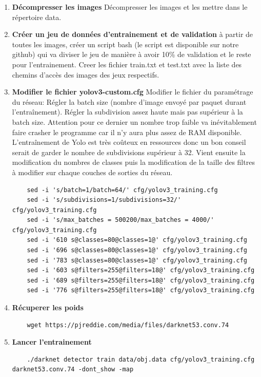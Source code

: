 \documentclass[12pt,a4paper]{report}
\begin{document}
\begin{spacing}{1.5}
\begin{enumerate}
    \item \textbf{Décompresser les images}
    Décompresser les images et les mettre dans le répertoire data.
    
    \item \textbf{Créer un jeu de données d'entrainement et de validation}
    à partir de toutes les images, créer un script bash (le script est disponible sur notre github) qui va diviser le jeu de manière à avoir 10\% de validation et le reste pour l'entrainement. Creer les fichier train.txt et test.txt avec la liste des chemins d'accès des images des jeux respectifs.
    
    \item \textbf{Modifier le fichier yolov3-custom.cfg}
    Modifier le fichier du paramétrage du réseau: Régler la batch size (nombre d'image envoyé par paquet durant l'entraînement). Régler la subdivision assez haute mais pas supérieur à la batch size. Attention pour ce dernier un nombre trop faible va inévitablement faire crasher le programme car il n'y aura plus assez de RAM disponible. L'entraînement de Yolo est très coûteux en ressources donc un bon conseil serait de garder le nombre de subdivisions supérieur à 32. Vient ensuite la modification du nombres de classes puis la modification de la taille des filtres à modifier sur chaque couches de sorties du réseau.
    \begin{lstlisting}
    sed -i 's/batch=1/batch=64/' cfg/yolov3_training.cfg
    sed -i 's/subdivisions=1/subdivisions=32/' cfg/yolov3_training.cfg
    sed -i 's/max_batches = 500200/max_batches = 4000/' cfg/yolov3_training.cfg
    sed -i '610 s@classes=80@classes=1@' cfg/yolov3_training.cfg
    sed -i '696 s@classes=80@classes=1@' cfg/yolov3_training.cfg
    sed -i '783 s@classes=80@classes=1@' cfg/yolov3_training.cfg
    sed -i '603 s@filters=255@filters=18@' cfg/yolov3_training.cfg
    sed -i '689 s@filters=255@filters=18@' cfg/yolov3_training.cfg
    sed -i '776 s@filters=255@filters=18@' cfg/yolov3_training.cfg
    \end{lstlisting}
    
    \item \textbf{Récuperer les poids}
    \begin{lstlisting}
    wget https://pjreddie.com/media/files/darknet53.conv.74
    \end{lstlisting}
    
    \item \textbf{Lancer l'entrainement}
    \begin{lstlisting}
    ./darknet detector train data/obj.data cfg/yolov3_training.cfg darknet53.conv.74 -dont_show -map
    \end{lstlisting}
    

\end{enumerate}
\end{spacing}
\end{document}
